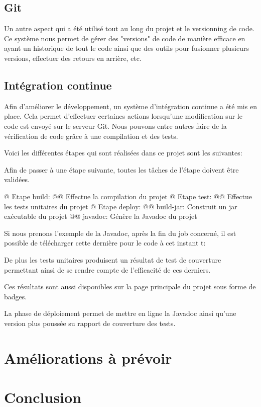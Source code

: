 \documentclass[final, noposter]{polytech/polytech}
\begin{document}
		
	\section{Git}
		Un autre aspect qui a été utilisé tout au long du projet et le versionning de code.
		Ce système nous permet de gérer des "versions" de code de manière efficace en ayant un historique de tout le code ainsi que des outils pour fusionner plusieurs versions, effectuer des retours en arrière, etc.
		
	\section{Intégration continue} 
		Afin d'améliorer le développement, un système d'intégration continue a été mis en place.
	Cela permet d'effectuer certaines actions lorsqu'une modification sur le code est envoyé sur le serveur Git.
	Nous pouvons entre autres faire de la vérification de code grâce à une compilation et des tests.
	
	Voici les différentes étapes qui sont réalisées dans ce projet sont les suivantes:
	
	Afin de passer à une étape suivante, toutes les tâches de l'étape doivent être validées.
		
	\begin{easylist}[itemize]
		@ Etape build:
		@@ Effectue la compilation du projet
		@ Etape test:
		@@ Effectue les tests unitaires du projet
		@ Etape deploy:
		@@ build-jar: Construit un jar exécutable du projet
		@@ javadoc: Génère la Javadoc du projet
	\end{easylist}
	
	Si nous prenons l'exemple de la Javadoc, après la fin du job concerné, il est possible de télécharger cette dernière pour le code à cet instant t:
	
	De plus les tests unitaires produisent un résultat de test de couverture permettant ainsi de se rendre compte de l'efficacité de ces derniers. 
	
	Ces résultats sont aussi disponibles sur la page principale du projet sous forme de badges.
	
	La phase de déploiement permet de mettre en ligne la Javadoc ainsi qu'une version plus poussée su rapport de couverture des tests.

\chapter{Améliorations à prévoir}

\chapter{Conclusion}
\end{document}
